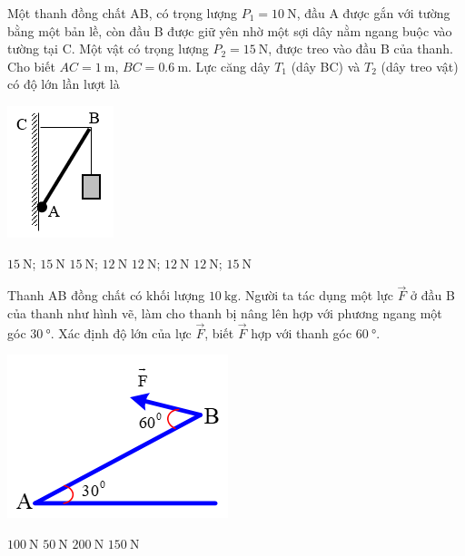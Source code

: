 \begin{ex}
Một thanh đồng chất AB, có trọng lượng $P_1=\SI{10}{\newton}$, đầu A được gắn với tường bằng một bản lề, còn đầu B được giữ yên nhờ một sợi dây nằm ngang buộc vào tường tại C. Một vật có trọng lượng $P_2=\SI{15}{\newton}$, được treo vào đầu B của thanh. Cho biết $AC=\SI{1}{\meter}$, $BC=\SI{0.6}{\meter}$. Lực căng dây $T_1$ (dây BC) và $T_2$ (dây treo vật) có độ lớn lần lượt là
\begin{center}
	\includegraphics[width=0.15\linewidth]{../figs/VN10-2023-PH-TP0005-7}
\end{center}	
	\choice
	{$\SI{15}{\newton}$; $\SI{15}{\newton}$}
	{$\SI{15}{\newton}$; $\SI{12}{\newton}$}
	{$\SI{12}{\newton}$; $\SI{12}{\newton}$}
	{\True $\SI{12}{\newton}$; $\SI{15}{\newton}$}
\end{ex}
\begin{ex}
Thanh AB đồng chất có khối lượng $\SI{10}{\kilogram}$. Người ta tác dụng một lực $\vec F$ ở đầu B của thanh như hình vẽ, làm cho thanh bị nâng lên hợp với phương ngang một góc $\SI{30}{\degree}$. Xác định độ lớn của lực $\vec F$, biết $\vec F$ hợp với thanh góc $\SI{60}{\degree}$.
\begin{center}
	\includegraphics[width=0.25\linewidth]{../figs/VN10-2023-PH-TP0005-9}
\end{center}	
	\choice
	{$\SI{100}{\newton}$}
	{\True $\SI{50}{\newton}$}
	{$\SI{200}{\newton}$}
	{$\SI{150}{\newton}$}
\end{ex}
